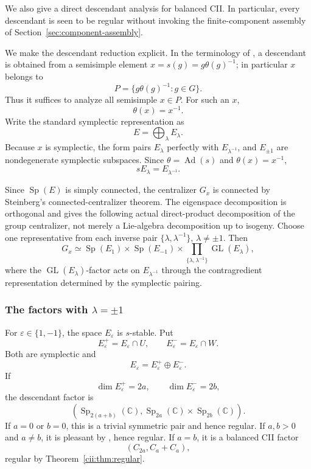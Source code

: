 \documentclass[10pt,a4paper]{amsart}
\numberwithin{equation}{section}
\newcommand{\C}{\mathbb C}
\newcommand{\GL}{\operatorname{GL}}
\newcommand{\Sp}{\operatorname{Sp}}
\newcommand{\Ad}{\operatorname{Ad}}
\begin{document}
We also give a direct descendant analysis for balanced CII.  In particular,
every descendant is seen to be regular without invoking the finite-component
assembly of Section~\ref{sec:component-assembly}.

We make the descendant reduction explicit.  In the terminology of
\cite[Definition~7.2.2]{AG09}, a descendant is obtained from a semisimple
element \(x=s(g)=g\theta(g)^{-1}\); in particular \(x\) belongs to
\[
  P=\{g\theta(g)^{-1}:g\in G\}.
\]
Thus it suffices to analyze all semisimple \(x\in P\).  For such an
\(x\),
\[
\theta(x)=x^{-1}.
\]
Write the standard symplectic representation as
\[
E=\bigoplus_\lambda E_\lambda.
\]
Because \(x\) is symplectic, the form pairs
\(E_\lambda\) perfectly with \(E_{\lambda^{-1}}\), and
\(E_{\pm1}\) are nondegenerate symplectic subspaces.  Since
\(\theta=\Ad(s)\) and \(\theta(x)=x^{-1}\),
\[
sE_\lambda=E_{\lambda^{-1}}.
\]

Since $\Sp(E)$ is simply connected, the centralizer $G_x$ is connected by
Steinberg's connected-centralizer theorem.  The eigenspace decomposition is
orthogonal and gives the following actual direct-product decomposition of the
group centralizer, not merely a Lie-algebra decomposition up to isogeny.
Choose one representative from each inverse pair
\(\{\lambda,\lambda^{-1}\}\), \(\lambda\neq\pm1\).  Then
\[
G_x
\simeq
\Sp(E_1)\times\Sp(E_{-1})
\times
\prod_{\{\lambda,\lambda^{-1}\}}
\GL(E_\lambda),
\]
where the \(\GL(E_\lambda)\)-factor acts on
\(E_{\lambda^{-1}}\) through the contragredient representation determined
by the symplectic pairing.

\subsubsection{The factors with \texorpdfstring{\(\lambda=\pm1\)}{lambda = +/-1}}

For \(\varepsilon\in\{1,-1\}\), the space \(E_\varepsilon\) is
\(s\)-stable.  Put
\[
E_\varepsilon^+=E_\varepsilon\cap U,\qquad
E_\varepsilon^-=E_\varepsilon\cap W.
\]
Both are symplectic and
\[
E_\varepsilon=E_\varepsilon^+\oplus E_\varepsilon^-.
\]
If
\[
\dim E_\varepsilon^+=2a,\qquad
\dim E_\varepsilon^-=2b,
\]
the descendant factor is
\[
\left(
\Sp_{2(a+b)}(\C),
\Sp_{2a}(\C)\times\Sp_{2b}(\C)
\right).
\]
If \(a=0\) or \(b=0\), this is a trivial symmetric pair and hence regular.
If \(a,b>0\) and \(a\neq b\), it is pleasant by
\cite[Proposition~4.16]{Rubio}, hence regular.  If \(a=b\), it is a
balanced CII factor
\[
(C_{2a},C_a+C_a),
\]
regular by Theorem~\ref{cii:thm:regular}.
\end{document}
